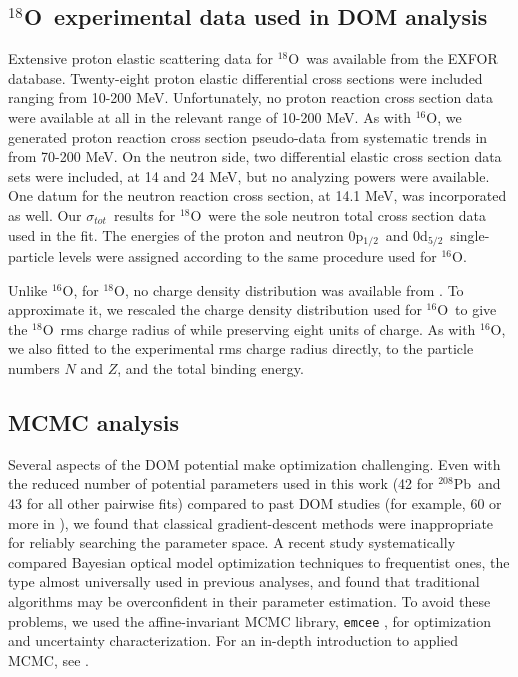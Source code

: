 \documentclass[twocolumn,secnumarabic,amssymb, nobibnotes, aps, prl,
superscriptaddress, nobalancelastpage, floatfix]{revtex4}
\newcommand{\tot}{\ensuremath{\sigma_{tot}}}
\newcommand{\oSix}{\ensuremath{^{16}}O}
\newcommand{\oEight}{\ensuremath{^{18}}O}
\newcommand{\pbEight}{\ensuremath{^{208}}P\lowercase{b}}
\newcommand{\pOne}{p\ensuremath{_{1/2}}}
\newcommand{\dFive}{d\ensuremath{_{5/2}}}
\begin{document}
\subsection{\oEight\ experimental data used in DOM analysis}
Extensive proton elastic scattering data for \oEight\ was
available from the EXFOR database. Twenty-eight proton elastic differential cross
sections were included ranging from 10-200 MeV.
Unfortunately, no proton reaction cross section data were available at all in
the relevant range of 10-200 MeV. As with \oSix, we generated proton reaction cross section pseudo-data from
systematic trends in \cite{Carlson1996} from 70-200 MeV. On the neutron side, two
differential elastic cross section data sets were included, at 14 and 24 MeV,
but no analyzing powers were available. One datum for the neutron reaction cross
section, at 14.1 MeV, was incorporated as well.
Our \tot\ results for \oEight\ were the
sole neutron total cross section data used in the fit. The energies of the
proton and neutron 0\pOne\ and 0\dFive\ single-particle
levels were assigned according to the same procedure used for \oSix.

Unlike \oSix, for \oEight, no charge density distribution was available from
\cite{DeVries1987}. To approximate it, we rescaled the charge density
distribution used for \oSix\ to give the \oEight\ rms charge radius of
\cite{Angeli2013} while preserving eight units of charge.
As with \oSix, we also fitted to the
experimental rms charge radius directly, to the particle numbers $N$ and $Z$, and the
total binding energy.

\subsection{MCMC analysis}

Several aspects of the DOM potential make optimization challenging.
Even with the reduced number of potential parameters used in this work (42 for \pbEight\ and 43 for
all other pairwise fits) compared to past DOM studies (for example, 60 or more in \cite{Mahzoon2017}),
we found that classical gradient-descent methods were inappropriate for reliably searching the
parameter space. A recent study \cite{King2019} systematically compared Bayesian optical model
optimization techniques to frequentist ones, the type almost universally used in previous analyses,
and found that traditional algorithms may be overconfident in their parameter estimation.
To avoid these problems, we used the affine-invariant MCMC library,
\texttt{emcee} \cite{Foreman-Mackey2013}, for optimization and uncertainty characterization.
For an in-depth introduction to applied MCMC, see \cite{Sharma2017}. 
\end{document}
